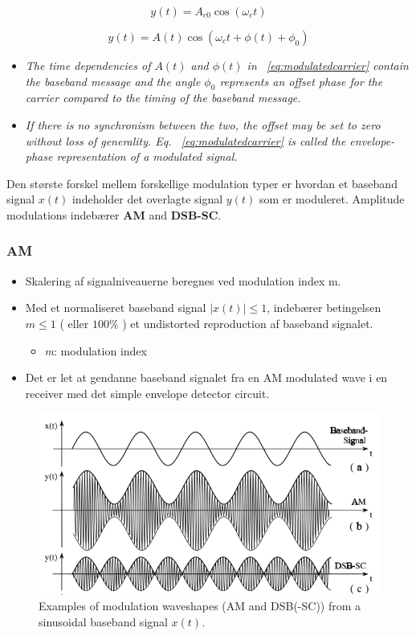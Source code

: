 \begin{equation}\label{eq:carrier}
y(t) = A_{c0} \cos(\omega_c t)
\end{equation}

\begin{equation}\label{eq:modulatedcarrier}
y(t) = A(t) \cos(\omega_c t + \phi(t) + \phi_0)
\end{equation}

\begin{itemize}
	\item \textit{The time dependencies of $A(t)$ and $\phi(t)$ in ~\ref{eq:modulatedcarrier} contain the baseband message and the angle $\phi_0$ represents an offset phase for the carrier compared to the timing of the baseband message.} 
	\item \textit{If there is no synchronism between the two, the offset may be set to zero without loss of generality. Eq. ~\ref{eq:modulatedcarrier} is called the envelope-phase representation of a modulated signal.}
\end{itemize}

Den største forskel mellem forskellige modulation typer er hvordan et baseband signal $x(t)$ indeholder det overlagte signal $y(t)$ som er moduleret. Amplitude modulations indebærer \textbf{AM} and \textbf{DSB-SC}.

\subsubsection{AM}
\begin{itemize}
	\item Skalering af signalniveauerne beregnes ved modulation index m.
	\item Med et normaliseret baseband signal $|x(t)|\leq 1$, indebærer betingelsen $m \leq 1$ ( eller $100 \% $ ) et undistorted reproduction af  baseband signalet.
	\begin{itemize}
		\item \textit{m}: modulation index 
	\end{itemize}
	\item Det er let at gendanne baseband signalet fra en AM modulated wave i en receiver med det simple envelope detector circuit. 
\end{itemize} 

\begin{figure} [H]
	\centering
	\includegraphics[width=\linewidth]{graphics/4.png}
	\caption{Examples of modulation waveshapes (AM and DSB(-SC)) from a sinusoidal baseband signal $x(t)$.}
	\label{fig:4}
\end{figure}

